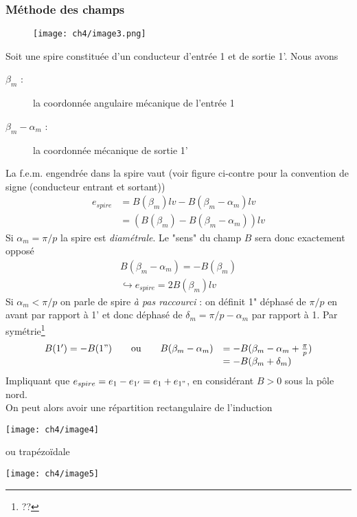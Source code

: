 		\subsubsection{Méthode des champs}
		\begin{wrapfigure}[11]{l}{4.8cm}
		\vspace{-5mm}
		\texttt{[image: ch4/image3.png]}
		\end{wrapfigure}
		Soit une spire constituée d'un conducteur d'entrée 1 et de sortie 
		1'. Nous avons
		\begin{description}
		\item[$\beta_m$ :] la coordonnée angulaire mécanique de l'entrée 1
		\item[$\beta_m-\alpha_m$ :] la coordonnée mécanique de sortie 1'
		\end{description}				
		La f.e.m. engendrée dans la spire vaut (voir figure ci-contre pour 
		la convention de signe (conducteur entrant et sortant))
		\begin{equation}
		\begin{array}{ll}
		e_{spire} &= B(\beta_m)lv - B(\beta_m-\alpha_m)lv\\
		&= (B(\beta_m)-B(\beta_m-\alpha_m))lv
		\end{array}
		\end{equation}
		Si $\alpha_m = \pi/p$ la spire est \textit{diamétrale}. Le "sens" 
		du champ $B$ sera donc exactement opposé
		\begin{equation}
		\begin{array}{l}
		B(\beta_m-\alpha_m) = - B(\beta_m)\\
		\hookrightarrow e_{spire} = 2B(\beta_m)lv
		\end{array}
		\end{equation}
		Si $\alpha_m<\pi/p$ on parle de spire \textit{à pas raccourci} : 
		on définit 1" déphasé de $\pi/p$ en avant par rapport à 1' et 
		donc déphasé de $\delta_m = \pi/p-\alpha_m$ par rapport à 1. Par 
		symétrie\footnote{??}
		\begin{equation}
		 \begin{array}{ll}
		B(1') = -B(1")\qquad\text{ou}\qquad B(\beta_m-\alpha_m) &=-B(\beta_m
		-\alpha_m+\frac{\pi}{p})\\
		&=-B(\beta_m+\delta_m)		
		\end{array}
		\end{equation}
		Impliquant que $e_{spire} = e_1-e_{1'}=e_1+e_{1"}$, en considérant 
		$B>0$ sous la pôle nord.\\
		On peut alors avoir une répartition rectangulaire de l'induction
		\begin{center}
		\texttt{[image: ch4/image4]}
		\end{center}
		ou  trapézoïdale 
		\begin{center}
		\texttt{[image: ch4/image5]}
		\end{center}
		
